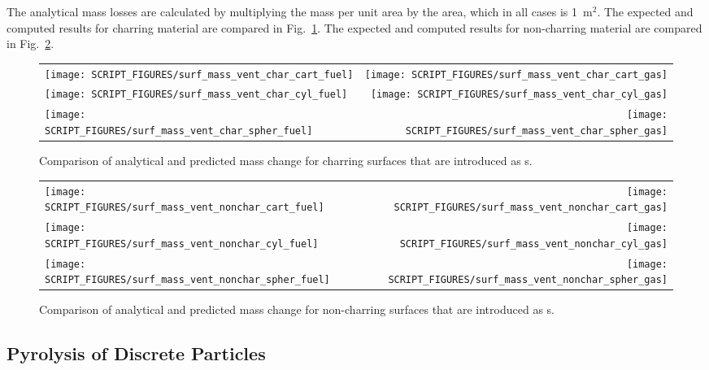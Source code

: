 \documentclass[11pt]{book}
\begin{document}
The analytical mass losses are calculated by multiplying the mass per unit area by the  area, which in all cases is 1~m$^2$. The expected and computed results for charring material are compared in Fig.~\ref{surf_mass_vent_char}. The expected and computed results for non-charring material are compared in Fig.~\ref{surf_mass_vent_nonchar}.

\begin{figure}[!htb]
\begin{tabular*}{\textwidth}{l@{\extracolsep{\fill}}r}
\texttt{[image: SCRIPT\_FIGURES/surf\_mass\_vent\_char\_cart\_fuel]} &
\texttt{[image: SCRIPT\_FIGURES/surf\_mass\_vent\_char\_cart\_gas]} \\
\texttt{[image: SCRIPT\_FIGURES/surf\_mass\_vent\_char\_cyl\_fuel]} &
\texttt{[image: SCRIPT\_FIGURES/surf\_mass\_vent\_char\_cyl\_gas]} \\
\texttt{[image: SCRIPT\_FIGURES/surf\_mass\_vent\_char\_spher\_fuel]} &
\texttt{[image: SCRIPT\_FIGURES/surf\_mass\_vent\_char\_spher\_gas]}
\end{tabular*}
\caption[The  test cases]{Comparison of analytical and predicted mass change for charring surfaces that are introduced as s.}
\label{surf_mass_vent_char}
\end{figure}

\begin{figure}[p]
\noindent
\begin{tabular*}{\textwidth}{l@{\extracolsep{\fill}}r}
\texttt{[image: SCRIPT\_FIGURES/surf\_mass\_vent\_nonchar\_cart\_fuel]} &
\texttt{[image: SCRIPT\_FIGURES/surf\_mass\_vent\_nonchar\_cart\_gas]} \\
\texttt{[image: SCRIPT\_FIGURES/surf\_mass\_vent\_nonchar\_cyl\_fuel]} &
\texttt{[image: SCRIPT\_FIGURES/surf\_mass\_vent\_nonchar\_cyl\_gas]} \\
\texttt{[image: SCRIPT\_FIGURES/surf\_mass\_vent\_nonchar\_spher\_fuel]} &
\texttt{[image: SCRIPT\_FIGURES/surf\_mass\_vent\_nonchar\_spher\_gas]}
\end{tabular*}
\caption[The  test cases]{Comparison of analytical and predicted mass change for non-charring surfaces that are introduced as s.}
\label{surf_mass_vent_nonchar}
\end{figure}


\subsection{Pyrolysis of Discrete Particles}
\end{document}
